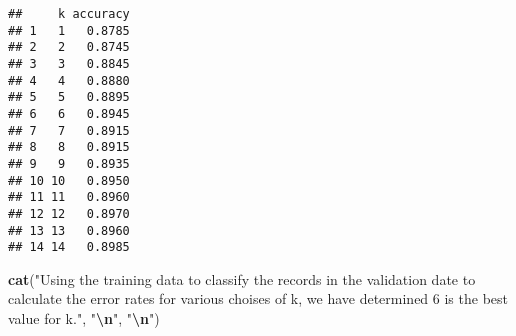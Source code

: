 \documentclass[
]{article}
\newenvironment{Shaded}{\begin{snugshade}}{\end{snugshade}}
\newcommand{\AttributeTok}[1]{\textcolor[rgb]{0.13,0.29,0.53}{#1}}
\newcommand{\CommentTok}[1]{\textcolor[rgb]{0.56,0.35,0.01}{\textit{#1}}}
\newcommand{\ConstantTok}[1]{\textcolor[rgb]{0.56,0.35,0.01}{#1}}
\newcommand{\ControlFlowTok}[1]{\textcolor[rgb]{0.13,0.29,0.53}{\textbf{#1}}}
\newcommand{\DecValTok}[1]{\textcolor[rgb]{0.00,0.00,0.81}{#1}}
\newcommand{\FunctionTok}[1]{\textcolor[rgb]{0.13,0.29,0.53}{\textbf{#1}}}
\newcommand{\NormalTok}[1]{#1}
\newcommand{\OtherTok}[1]{\textcolor[rgb]{0.56,0.35,0.01}{#1}}
\newcommand{\SpecialCharTok}[1]{\textcolor[rgb]{0.81,0.36,0.00}{\textbf{#1}}}
\newcommand{\StringTok}[1]{\textcolor[rgb]{0.31,0.60,0.02}{#1}}
\begin{document}
\begin{Shaded}
\end{Shaded}

\begin{verbatim}
##     k accuracy
## 1   1   0.8785
## 2   2   0.8745
## 3   3   0.8845
## 4   4   0.8880
## 5   5   0.8895
## 6   6   0.8945
## 7   7   0.8915
## 8   8   0.8915
## 9   9   0.8935
## 10 10   0.8950
## 11 11   0.8960
## 12 12   0.8970
## 13 13   0.8960
## 14 14   0.8985
\end{verbatim}

\begin{Shaded}
\begin{Highlighting}[]
\FunctionTok{cat}\NormalTok{(}\StringTok{"Using the training data to classify the records in the validation date to calculate the error rates for various choises of k, we have determined \textquotesingle{}6\textquotesingle{} is the best value for k."}\NormalTok{, }\StringTok{"}\SpecialCharTok{\textbackslash{}n}\StringTok{"}\NormalTok{, }\StringTok{"}\SpecialCharTok{\textbackslash{}n}\StringTok{"}\NormalTok{)}
\end{Highlighting}
\end{Shaded}
\end{document}
